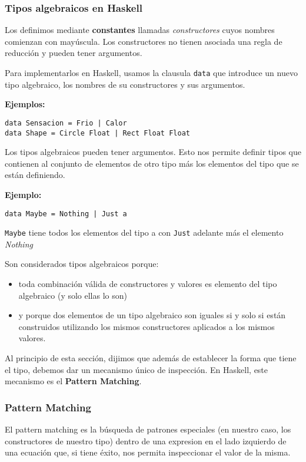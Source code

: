 \subsubsection{Tipos algebraicos en Haskell}
Los definimos mediante \textbf{constantes} llamadas \textit{constructores} cuyos nombres comienzan con mayúscula. Los constructores no tienen asociada una regla de reducción y pueden tener argumentos.

Para implementarlos en Haskell, usamos la clausula \texttt{data} que introduce un nuevo tipo algebraico, los nombres de su constructores y sus argumentos.

\textbf{Ejemplos:}
\begin{centrado}
	\begin{verbatim}
data Sensacion = Frio | Calor
data Shape = Circle Float | Rect Float Float
	\end{verbatim}
\end{centrado}

Los tipos algebraicos pueden tener argumentos. Esto nos permite definir tipos que contienen al conjunto de elementos de otro tipo más los elementos del tipo que se están definiendo.

\textbf{Ejemplo:}
\begin{centrado}
	\begin{verbatim}
data Maybe = Nothing | Just a
	\end{verbatim}
\end{centrado}
\texttt{Maybe} tiene todos los elementos del tipo a con \texttt{Just} adelante más el elemento \textit{Nothing}

\vspace*{5mm}

Son considerados tipos algebraicos porque:
\begin{itemize}
	\item toda combinación válida de constructores y valores es elemento del tipo algebraico (y solo ellas lo son)
	\item y porque dos elementos de un tipo algebraico son iguales si y solo si están construidos utilizando los mismos constructores aplicados a los mismos valores.
\end{itemize}
Al principio de esta sección, dijimos que además de establecer la forma que tiene el tipo, debemos dar un mecanismo único de inspección. En Haskell, este mecanismo es el \textbf{Pattern Matching}.


\subsubsection{Pattern Matching}
El pattern matching es la búsqueda de patrones especiales (en nuestro caso, los constructores de nuestro tipo) dentro de una expresion en el lado izquierdo de una ecuación que, si tiene éxito, nos permita inspeccionar el valor de la misma.

